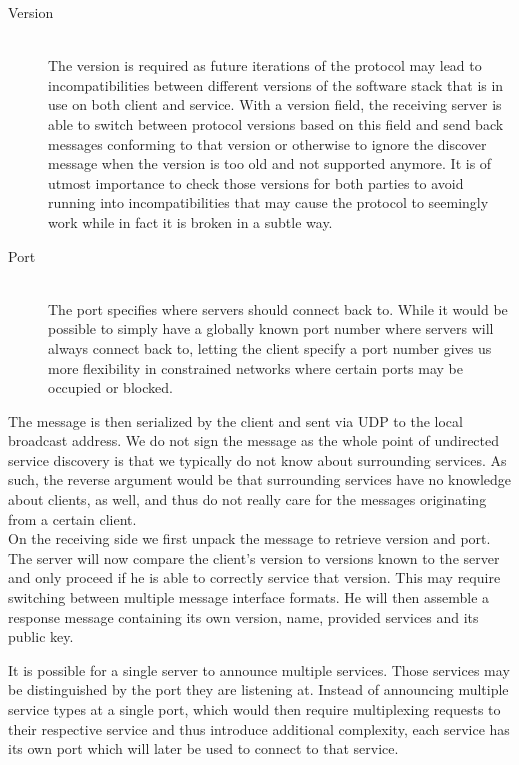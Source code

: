 \begin{description}
    \item[Version]\hfill\\
        The version is required as future iterations of the protocol may lead to incompatibilities between different versions of the software stack that is in use on both client and service.
        With a version field, the receiving server is able to switch between protocol versions based on this field and send back messages conforming to that version or otherwise to ignore the discover message when the version is too old and not supported anymore.
        It is of utmost importance to check those versions for both parties to avoid running into incompatibilities that may cause the protocol to seemingly work while in fact it is broken in a subtle way.
    \item[Port]\hfill\\
        The port specifies where servers should connect back to.
        While it would be possible to simply have a globally known port number where servers will always connect back to, letting the client specify a port number gives us more flexibility in constrained networks where certain ports may be occupied or blocked.
\end{description}

The message is then serialized by the client and sent via UDP to the local broadcast address.
We do not sign the message as the whole point of undirected service discovery is that we typically do not know about surrounding services.
As such, the reverse argument would be that surrounding services have no knowledge about clients, as well, and thus do not really care for the messages originating from a certain client.\\

On the receiving side we first unpack the message to retrieve version and port.
The server will now compare the client's version to versions known to the server and only proceed if he is able to correctly service that version.
This may require switching between multiple message interface formats.
He will then assemble a response message containing its own version, name, provided services and its public key.

It is possible for a single server to announce multiple services.
Those services may be distinguished by the port they are listening at.
Instead of announcing multiple service types at a single port, which would then require multiplexing requests to their respective service and thus introduce additional complexity, each service has its own port which will later be used to connect to that service.

